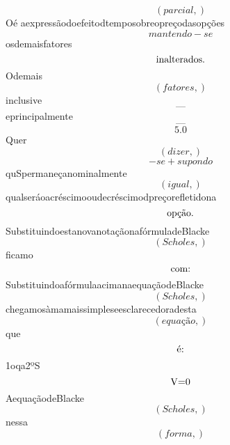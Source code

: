 \documentclass{article}
\begin{document}
\begin{equation}
\left( parcial,\right)
\end{equation}Oé aexpressãodoefeitodtemposobreopreçodasopções\begin{equation}
mantendo - se
\end{equation}osdemaisfatores\begin{equation}
$inalterados.$
\end{equation}Odemais\begin{equation}
\left( fatores,\right)
\end{equation}inclusive\begin{equation}
—
\end{equation}eprincipalmente\begin{equation}
—
\end{equation}\begin{equation}
5.0
\end{equation}Quer\begin{equation}
\left( dizer,\right)
\end{equation}\begin{equation}
- se + supondo
\end{equation}quSpermaneçanominalmente\begin{equation}
\left( igual,\right)
\end{equation}qualseráoacréscimooudecréscimodpreçorefletidona\begin{equation}
$opção.$
\end{equation}SubstituindoestanovanotaçãonafórmuladeBlacke\begin{equation}
\left( Scholes,\right)
\end{equation}ficamo\begin{equation}
$com:$
\end{equation}SubstituindoafórmulaacimanaequaçãodeBlacke\begin{equation}
\left( Scholes,\right)
\end{equation}chegamosàmamaissimpleseesclarecedoradesta\begin{equation}
\left( equação,\right)
\end{equation}que\begin{equation}
$é:$
\end{equation}1oqa2ºS\begin{equation}
$V=0$
\end{equation}AequaçãodeBlacke\begin{equation}
\left( Scholes,\right)
\end{equation}nessa\begin{equation}
\left( forma,\right)

\end{equation}
\end{document}
